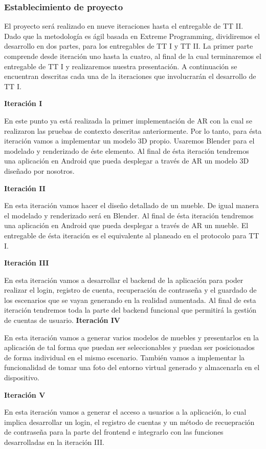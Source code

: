 \subsubsection{Establecimiento de proyecto}
El proyecto será realizado en nueve iteraciones hasta el entregable de TT II. Dado que la metodología es ágil basada en Extreme Programming, dividiremos el desarrollo en dos partes, para los entregables de TT I y TT II. La primer parte comprende desde iteración uno hasta la cuatro, al final de la cual terminaremos el entregable de TT I y realizaremos nuestra presentación. A continuación se encuentran descritas cada una de la iteraciones que involucrarán el desarrollo de TT I.\par

\textbf{Iteración I} \par
En este punto ya está realizada la primer implementación de AR con la cual se realizaron las pruebas de contexto descritas anteriormente. Por lo tanto, para ésta iteración vamos a implementar un modelo 3D propio. Usaremos Blender para el modelado y renderizado de éste elemento. Al final de ésta iteración tendremos una aplicación en Android que pueda desplegar a través de AR un modelo 3D diseñado por nosotros.

\textbf{Iteración II} \par
En esta iteración vamos hacer el diseño detallado de un mueble. De igual manera el modelado y renderizado será en Blender. Al final de ésta iteración tendremos una aplicación en Android que pueda desplegar a través de AR un mueble. El entregable de ésta iteración es el equivalente al planeado en el protocolo para TT I.

\textbf{Iteración III} \par
En esta iteración vamos a desarrollar el backend de la aplicación para poder realizar el login, registro de cuenta, recuperación de contraseña y el guardado de los escenarios que se vayan generando en la realidad aumentada. Al final de esta iteración tendremos toda la parte del backend funcional que permitirá la gestión de cuentas de usuario.
\clearpage
\textbf{Iteración IV} \par
En esta iteración vamos a generar varios modelos de muebles y presentarlos en la aplicación de tal forma que puedan ser seleccionables y puedan ser posicionados de forma individual en el mismo escenario. También vamos a implementar la funcionalidad de tomar una foto del entorno virtual generado y almacenarla en el dispositivo.

\textbf{Iteración V} \par
En esta iteración vamos a generar el acceso a usuarios a la aplicación, lo cual implica desarrollar un login, el registro de cuentas y un método de recuepración de contraseña para la parte del frontend e integrarlo con las funciones desarrolladas en la iteración III.


